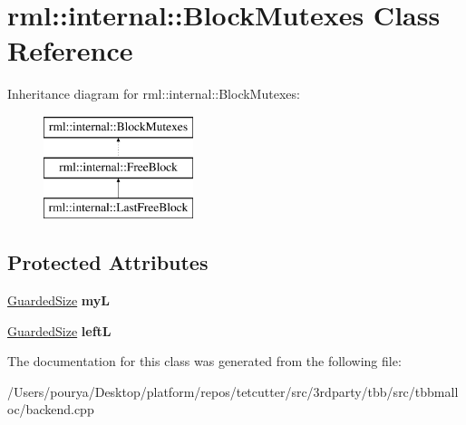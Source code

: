 \hypertarget{classrml_1_1internal_1_1BlockMutexes}{}\section{rml\+:\+:internal\+:\+:Block\+Mutexes Class Reference}
\label{classrml_1_1internal_1_1BlockMutexes}
Inheritance diagram for rml\+:\+:internal\+:\+:Block\+Mutexes\+:\begin{figure}[H]
\begin{center}
\leavevmode
\includegraphics[height=3.000000cm]{classrml_1_1internal_1_1BlockMutexes}
\end{center}
\end{figure}
\subsection*{Protected Attributes}
\begin{DoxyCompactItemize}
\item 
\hypertarget{classrml_1_1internal_1_1BlockMutexes_a5688e6c1f527bd09e0c02756403efb29}{}\hyperlink{classrml_1_1internal_1_1GuardedSize}{Guarded\+Size} {\bfseries my\+L}\label{classrml_1_1internal_1_1BlockMutexes_a5688e6c1f527bd09e0c02756403efb29}

\item 
\hypertarget{classrml_1_1internal_1_1BlockMutexes_a4e11b4c14c13814dbe7553ac42b004fb}{}\hyperlink{classrml_1_1internal_1_1GuardedSize}{Guarded\+Size} {\bfseries left\+L}\label{classrml_1_1internal_1_1BlockMutexes_a4e11b4c14c13814dbe7553ac42b004fb}

\end{DoxyCompactItemize}


The documentation for this class was generated from the following file\+:\begin{DoxyCompactItemize}
\item 
/\+Users/pourya/\+Desktop/platform/repos/tetcutter/src/3rdparty/tbb/src/tbbmalloc/backend.\+cpp\end{DoxyCompactItemize}
